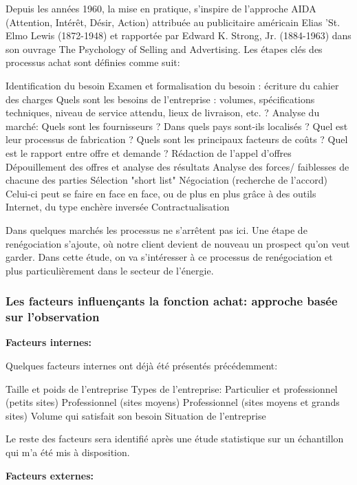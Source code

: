 \documentclass[12pt]{article}
\begin{document}
Depuis les années 1960, la mise en pratique, s’inspire de l’approche AIDA (Attention, Intérêt, Désir, Action) attribuée au publicitaire américain Elias 'St. Elmo Lewis (1872-1948) et rapportée par Edward K. Strong, Jr. (1884-1963) dans son ouvrage The Psychology of Selling and Advertising.
\medbreak
Les étapes clés des processus achat sont définies comme suit:
\begin{outline}
\1 Identification du besoin
\1	Examen et formalisation du besoin : écriture du cahier des charges
   \2Quels sont les besoins de l'entreprise : volumes, spécifications techniques, niveau de service attendu, lieux de livraison, etc. ?
\1 Analyse du marché:
\2Quels sont les fournisseurs ? Dans quels pays sont-ils localisés ?
\2Quel est leur processus de fabrication ?
\2Quels sont les principaux facteurs de coûts ?
\2Quel est le rapport entre offre et demande ?
\1Rédaction de l'appel d'offres
\1Dépouillement des offres et analyse des résultats
\1Analyse des forces/ faiblesses de chacune des parties
\1Sélection "short list"
\1Négociation (recherche de l'accord) Celui-ci peut se faire en face en face, ou de plus en plus grâce à des outils Internet, du type enchère inversée
\1Contractualisation

\end{outline}

Dans quelques marchés les processus ne s’arrêtent pas ici. Une étape de renégociation s’ajoute, où notre client devient de nouveau un prospect qu’on veut garder.
Dans cette étude, on va s'intéresser à ce processus de renégociation et plus particulièrement dans le secteur de l’énergie.

\subsubsection{Les facteurs influençants la fonction achat: approche basée sur l'observation}
\textbf{\large Facteurs internes:}

Quelques facteurs internes ont déjà été présentés précédemment:
\begin{outline}
\1 Taille et poids de l’entreprise
\1 Types de l’entreprise:
\2 Particulier et professionnel (petits sites)
\2 Professionnel (sites moyens)
\2 Professionnel (sites moyens et grands sites)
\1 Volume qui satisfait son besoin 
\1 Situation de l’entreprise
\end{outline}
Le reste des facteurs sera identifié après une étude statistique sur un échantillon qui m’a été mis à disposition.

\textbf{\large Facteurs externes:}
\end{document}

